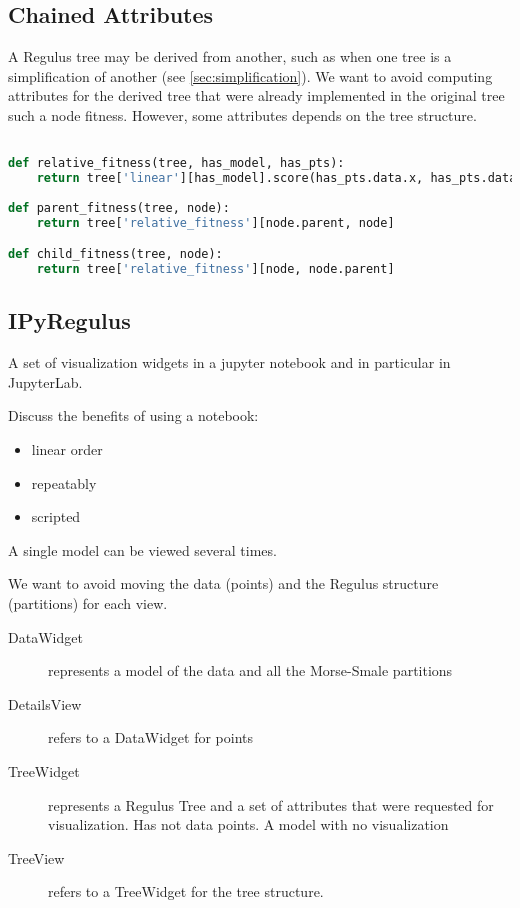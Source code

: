 \subsection{Chained Attributes}
\label{sec:chained_attrs}

A Regulus tree may be derived from another, such as when one tree is a simplification of another (see \autoref{sec:simplification}). We want to avoid computing attributes for the derived tree that were already implemented in the original tree such a node fitness. However, some attributes depends on the tree structure.  

\begin{lstlisting}[language=Python, 
    caption=Chained attributes. Parent/child relation depends on the current tree structure, float=htb, label=fig:relative-fitness]

def relative_fitness(tree, has_model, has_pts):
    return tree['linear'][has_model].score(has_pts.data.x, has_pts.data.y)
    
def parent_fitness(tree, node):
    return tree['relative_fitness'][node.parent, node]

def child_fitness(tree, node):
    return tree['relative_fitness'][node, node.parent]    
\end{lstlisting}

\subsection{IPyRegulus}
\label{sec:ipyregulus}

A set of visualization widgets in a jupyter notebook and in particular in JupyterLab.

Discuss the benefits of using a notebook:
\begin{itemize}
    \item linear order
    \item repeatably
    \item scripted
\end{itemize}

A single model can be viewed several times. 

We want to avoid moving the data (points) and the Regulus structure (partitions) for each view. 

\begin{description}
\item[DataWidget] represents a model of the data and all the Morse-Smale partitions 
\item[DetailsView] refers to a DataWidget for points
\item[TreeWidget] represents a Regulus Tree and a set of attributes that were requested for visualization. Has not data points. A model with no visualization
\item[TreeView] refers to a TreeWidget for the tree structure.
\end{description}

